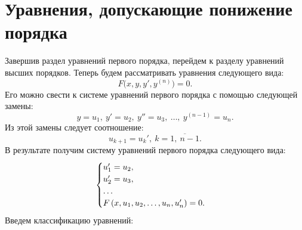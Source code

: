 \section{Уравнения, допускающие понижение порядка}

    Завершив раздел уравнений первого порядка, перейдем к разделу уравнений высших порядков. Теперь будем рассматривать уравнения следующего вида:
    \[
        F \Big( x, y, y', y^{(n)} \Big) = 0.
    \]
    Его можно свести к системе уравнений первого порядка с помощью следующей замены:
    \[
        y = u_1, ~ y' = u_2, ~ y'' = u_3, ~ \dots, ~ y^{(n - 1)} = u_n.
    \]
    Из этой замены следует соотношение:
    \[
        u_{k + 1} = u_k', ~ k = \overline{1, ~ n - 1}.
    \]
    В результате получим систему уравнений первого порядка следующего вида:
    \[
        \begin{cases}
            u_1' = u_2, \\
            u_2' = u_3, \\
            \dots \\
            F \left( x, u_1, u_2, \dots, u_n, u_n' \right) = 0.
        \end{cases}
    \]
    Введем классификацию уравнений:

